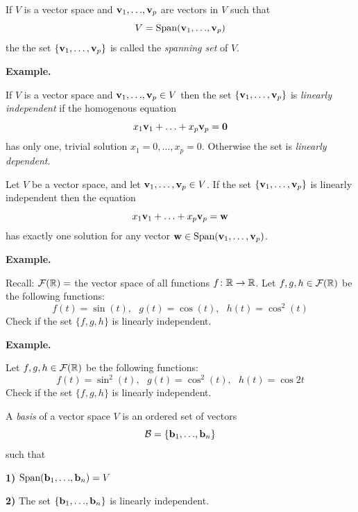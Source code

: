 {\vskip 5mm

\begin{cbox}[Definition]
If $V$ is a vector space and ${\bf v}_{1}, {\dots}, {\bf v}_{p}$ are vectors in $V$ such that 
$$ V = \text{Span}({\bf v}_{1}, {\dots}, {\bf v}_{p})$$
the the set $\{{\bf v}_{1}, \dots , {\bf v}_{p} \}$ is called the \emph{spanning set} of $V$. 
\end{cbox}

\newpage

{\bf Example.}

\newpage

\begin{cbox}[Definition]
If $V$ is a vector space and ${\bf v}_{1}, {\dots}, {\bf v}_{p} \in V$
then the set $\{{\bf v}_{1}, \dots , {\bf v}_{p} \}$ is \emph{linearly independent}
if the homogenous equation 
$$x_{1}{\bf v}_{1} + {\dots} + x_{p}{\bf v}_{p} = {\bf 0}$$
has only one, trivial solution $x_{1} = 0, \dots, x_{p} = 0$. Otherwise the set is \emph{linearly dependent}.
\end{cbox}

\vskip 5mm

\begin{cbox}[Theorem]
Let $V$ be a vector space, and let ${\bf v}_{1}, \dots, {\bf v}_{p}\in V$. If the set  $\{{\bf v}_{1}, \dots, {\bf v}_{p} \}$ 
is  linearly independent then the equation
$$x_{1}{\bf v}_{1} + {\dots} + x_{p}{\bf v}_{p} = {\bf w}$$
has exactly one solution for any vector ${\bf w} \in \text{Span}({\bf v}_{1}, \dots, {\bf v}_{p})$. 
\end{cbox}


\newpage

{\bf Example.}

\vskip 5mm

Recall: ${\mathcal F}({\mathbb R}) = $ the vector space of all functions $f\colon {\mathbb R}\to {\mathbb R}$. Let $f, g, h\in {\mathcal F}({\mathbb R})$ be the following 
functions:
$$f(t) = \sin(t), \ \ \ g(t) = \cos(t), \ \ \ h(t) = \cos^{2}(t)$$
Check if the set $\{f, g, h\}$ is linearly independent. 

\newpage


{\bf Example.}

\vskip 5mm

Let $f, g, h\in {\mathcal F}({\mathbb R})$ be the following functions:
$$f(t) = \sin^{2}(t), \ \ \ g(t) = \cos^{2}(t), \ \ \ h(t) = \cos 2t$$
Check if the set $\{f, g, h\}$ is linearly independent. 

\newpage


\begin{cbox}[Definition]
A \emph{basis} of a vector space $V$ is an ordered set of vectors
$${\mathcal B} = \{{\bf b}_{1}, {\dots}, {\bf b}_{n}\}$$
such that 
\benu
\item[\bf 1)]  $\text{Span}({\bf b}_{1}, {\dots}, {\bf b}_{n}) = V$ \\[-4mm]
\item[\bf 2)]  The set $\{{\bf b}_{1}, {\dots}, {\bf b}_{n}\}$ is linearly independent. 
\eenu
\end{cbox}

}
